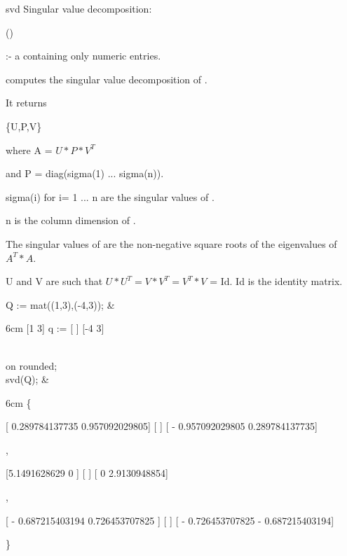 \begin{Operator}{svd}
Singular value decomposition:

\begin{Syntax}
()
\end{Syntax}

 :- a  containing only numeric entries.


 computes the singular value decomposition of . 

It returns 

\{U,P,V\} 

where A = $U*P*V^T$

and P = diag(sigma(1) ... sigma(n)). 

sigma(i) for i= 1 ... n are the singular values of 
.

n is the column dimension of .

The singular values of  are the non-negative square roots 
of the eigenvalues of $A^T*A$.

U and V are such that $U*U^T = V*V^T = V^T*V$ = Id.
Id is the identity matrix.


\begin{Examples}

Q := mat((1,3),(-4,3)); &
\begin{multilineoutput}{6cm}
     [1   3]
q := [     ]
     [-4  3]
\end{multilineoutput}\\

on rounded; \\
svd(Q); &
\begin{multilineoutput}{6cm}
\{

 [ 0.289784137735    0.957092029805]
 [                                 ]
 [ - 0.957092029805  0.289784137735]

 ,


 [5.1491628629       0      ]
 [                          ]
 [     0        2.9130948854]

 ,


 [ - 0.687215403194   0.726453707825  ]
 [                                    ]
 [ - 0.726453707825   - 0.687215403194]

\}
\end{multilineoutput}\\

\end{Examples}

\end{Operator}


